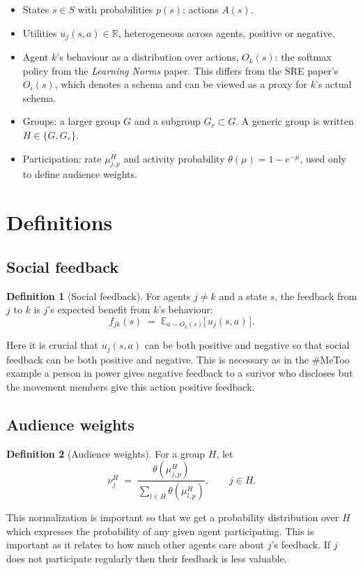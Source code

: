 \documentclass[11pt]{article}
\newcommand{\Gr}{G_{r}}          %
\newcommand{\E}{\mathbb{E}}
\theoremstyle{definition}
\newtheorem{definition}{Definition}[section]
\theoremstyle{remark}
\begin{document}
\begin{itemize}[nosep]
  \item States $s \in S$ with probabilities $p(s)$; actions $A(s)$.
  \item Utilities $u_j(s,a) \in \mathbb{R}$, heterogeneous across agents, positive or negative.
  \item Agent $k$'s behaviour as a distribution over actions, $O_k(s)$: the softmax policy from the \textit{Learning Norms} paper. This differs from the SRE paper's $O_i(s)$, which denotes a schema
  and can be viewed as a proxy for $k$'s actual schema.
  \item Groups: a larger group $G$ and a subgroup $\Gr \subset G$. A generic group is written $H \in \{G, \Gr\}$.
  \item Participation: rate $\mu_{j,p}^H$ and activity probability $\theta(\mu) = 1 - e^{-\mu}$, used only to define audience weights.
\end{itemize}

\section{Definitions}\label{sec:defs}
\subsection{Social feedback}\label{sec:feedback}
\begin{definition}[Social feedback]
For agents $j \neq k$ and a state $s$, the feedback from $j$ to $k$ is $j$'s expected benefit from $k$'s behaviour:
\begin{equation}
  f_{jk}(s) \;=\; \E_{a \sim O_k(s)}\big[\, u_j(s,a) \,\big].
\end{equation}
\end{definition}
Here it is crucial that $u_j(s, a)$ can be both positive and negative so that social feedback
can be both positive and negative. This is necessary as in the \#MeToo example
a person in power gives negative feedback to a surivor who discloses but the movement members
give this action positive feedback.

\subsection{Audience weights}
\begin{definition}[Audience weights]
For a group $H$, let
\begin{equation}
  \nu_j^H \;=\; \frac{\theta(\mu_{j,p}^H)}{\sum_{l \in H} \theta(\mu_{l,p}^H)}, \qquad j \in H.
\end{equation}
\end{definition}
This normalization is important so that we get a probability distribution over $H$ which expresses
the probability of any given agent participating. This is important as it relates
to how much other agents care about $j$'s feedback. If $j$ does not participate regularly
then their feedback is less valuable.
\end{document}
